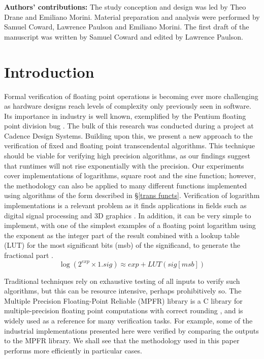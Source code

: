 \documentclass{fac}
\begin{document}
\noindent\textbf{Authors' contributions:} The study conception and design was led by Theo Drane and Emiliano Morini. Material preparation and analysis were performed by Samuel Coward, Lawrence Paulson and Emiliano Morini. The first draft of the manuscript was written by Samuel Coward and edited by Lawrence Paulson.

\section{Introduction}
\label{intro}
Formal verification of floating point operations is becoming ever more challenging as hardware designs reach levels of complexity only previously seen in software. Its importance in industry is well known, exemplified by the Pentium floating point division bug \cite{pratt1995anatomy}. The bulk of this research was conducted during a project at Cadence Design Systems. Building upon this, we present a new approach to the verification of fixed and floating point transcendental algorithms. This technique should be viable for verifying high precision algorithms, as our findings suggest that runtimes will not rise exponentially with the precision.  Our experiments cover implementations of logarithms, square root and the sine function; however, the methodology can also be applied to many different functions implemented using algorithms of the form described in \S \ref{trans functs}. Verification of logarithm implementations is a relevant problem as it finds applications in fields such as digital signal processing and 3D graphics \cite{lewis1995114,harris2001powering}. In addition, it can be very simple to implement, with one of the simplest examples of a floating point logarithm using the exponent as the integer part of the result combined with a lookup table (LUT) for the most significant bits (msb) of the significand, to generate the fractional part \cite{harris2001powering}.
\begin{equation*}
    \log(2^{\textit{exp}} \times 1.sig) \approx \textit{exp} + LUT(\textit{sig}[msb])
\end{equation*}

Traditional techniques rely on exhaustive testing of all inputs to verify such algorithms, but this can be resource intensive, perhaps prohibitively so. The Multiple Precision Floating-Point Reliable (MPFR) library is a C library for multiple-precision floating point computations with correct rounding \cite{fousse2007mpfr}, and is widely used as a reference for many verification tasks. For example, some of the industrial implementations presented here were verified by comparing the outputs to the MPFR library. We shall see that the methodology used in this paper performs more efficiently in particular cases. 
\end{document}
